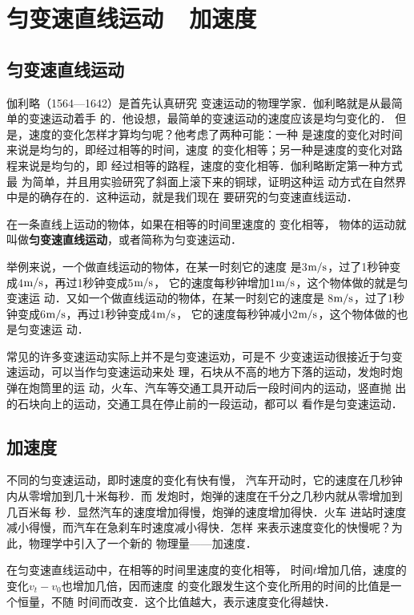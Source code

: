 \section{匀变速直线运动~~加速度}
    \subsection{匀变速直线运动}
    
    伽利略（1564—1642）是首先认真研究
变速运动的物理学家．伽利略就是从最简单的变速运动着手
的．他设想，最简单的变速运动的速度应该是均匀变化的．
但是，速度的变化怎样才算均匀呢？他考虑了两种可能：一种
是速度的变化对时间来说是均匀的，即经过相等的时间，速度
的变化相等；另一种是速度的变化对路程来说是均匀的，即
经过相等的路程，速度的变化相等．伽利略断定第一种方式最
为简单，并且用实验研究了斜面上滚下来的铜球，证明这种运
动方式在自然界中是的确存在的．这种运动，就是我们现在
要研究的匀变速直线运动．

在一条直线上运动的物体，如果在相等的时间里速度的
变化相等，
物体的运动就叫做\textbf{匀变速直线运动}，或者简称为匀变速运动．

举例来说，一个做直线运动的物体，在某一时刻它的速度
是3$\text{m}/\text{s}$，过了1秒钟变成4$\text{m}/\text{s}$，再过1秒钟变成5$\text{m}/\text{s}$，
它的速度每秒钟增加1$\text{m}/\text{s}$，这个物体做的就是匀变速运
动．又如一个做直线运动的物体，在某一时刻它的速度是
8$\text{m}/\text{s}$，过了1秒钟变成6$\text{m}/\text{s}$，再过1秒钟变成4$\text{m}/\text{s}$，
它的速度每秒钟减小2$\text{m}/\text{s}$，这个物体做的也是匀变速运
动．

    常见的许多变速运动实际上并不是匀变速运劝，可是不
少变速运动很接近于匀变速运动，可以当作匀变速运动来处
理，石块从不高的地方下落的运动，发炮时炮弹在炮筒里的运
动，火车、汽车等交通工具开动后一段时间内的运动，竖直抛
出的石块向上的运动，交通工具在停止前的一段运动，都可以
看作是匀变速运动．

\subsection{加速度}
不同的匀变速运动，即时速度的变化有快有慢，
汽车开动时，它的速度在几秒钟内从零增加到几十米每秒．而
发炮时，炮弹的速度在千分之几秒内就从零增加到几百米每
秒．显然汽车的速度增加得慢，炮弹的速度增加得快．火车
进站时速度减小得慢，而汽车在急刹车时速度减小得快．怎样
来表示速度变化的快慢呢？为此，物理学中引入了一个新的
物理量——加速度．

在匀变速直线运动中，在相等的时间里速度的变化相等，
时间$t$增加几倍，速度的变化$v_t-v_0$也增加几倍，因而速度
的变化跟发生这个变化所用的时间的比值是一个恒量，不随
时间而改变．这个比值越大，表示速度变化得越快．

